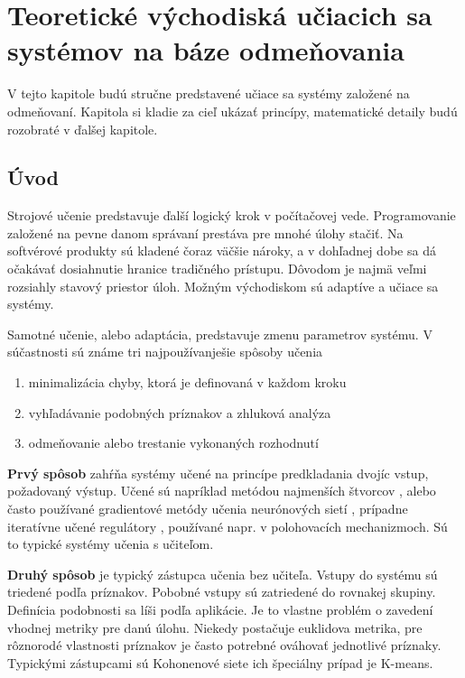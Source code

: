 \chapter{Teoretické východiská učiacich sa systémov na báze odmeňovania}

V tejto kapitole budú stručne predstavené učiace sa systémy založené na odmeňovaní.
Kapitola si kladie za cieľ ukázať princípy, matematické detaily budú
rozobraté v ďalšej kapitole.

\section{Úvod}

Strojové učenie predstavuje ďalší logický krok v počítačovej vede. Programovanie
založené na pevne danom správaní prestáva pre mnohé úlohy stačiť. Na softvérové
produkty sú kladené čoraz väčšie nároky, a v dohľadnej dobe sa dá očakávať
dosiahnutie hranice tradičného prístupu. Dôvodom je najmä veľmi rozsiahly stavový
priestor úloh. Možným východiskom sú adaptíve a učiace sa systémy.

Samotné učenie, alebo adaptácia, predstavuje zmenu parametrov systému.
V súčastnosti sú známe tri najpoužívanješie spôsoby učenia

\begin{enumerate}
\item minimalizácia chyby, ktorá je definovaná v každom kroku
\item vyhľadávanie podobných príznakov a zhluková analýza
\item odmeňovanie alebo trestanie vykonaných rozhodnutí
\end{enumerate}

{\bf Prvý spôsob} zahŕňa systémy učené na princípe predkladania dvojíc
vstup, požadovaný výstup. Učené sú napríklad metódou najmenších
štvorcov \cite{bib:adaptive_01} \cite{bib:adaptive_02} \cite{bib:adaptive_03},
alebo často používané gradientové metódy učenia neurónových sietí \cite{bib:gradient_01} \cite{bib:gradient_02}
\cite{bib:gradient_03} \cite{bib:backpropagation_00} \cite{bib:gradient_04}, prípadne
iteratívne učené regulátory \cite{bib:ilc_01} \cite{bib:ilc_02}, používané napr. v polohovacích mechanizmoch.
Sú to typické systémy učenia s učiteľom.

{\bf Druhý spôsob} je typický zástupca učenia bez učiteľa. Vstupy do systému
sú triedené podľa príznakov. Pobobné vstupy sú zatriedené do rovnakej skupiny.
Definícia podobnosti sa líši podľa aplikácie. Je to vlastne problém o zavedení vhodnej metriky
pre danú úlohu. Niekedy postačuje euklidova metrika, pre rôznorodé vlastnosti príznakov je často
potrebné ováhovať jednotlivé príznaky. Typickými zástupcami
sú Kohonenové siete \cite{bib:kohonen_01} \cite{bib:kohonen_02} \cite{bib:kohonen_03} ich špeciálny prípad je K-means.

